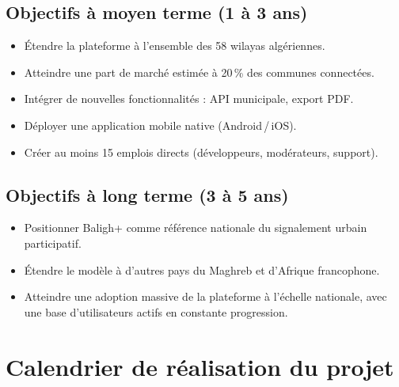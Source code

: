 \documentclass[12pt,a4paper]{report}
\begin{document}
\subsection{Objectifs à moyen terme (1 à 3 ans)}
\begin{itemize}
  \item Étendre la plateforme à l'ensemble des 58 wilayas algériennes.
  \item Atteindre une part de marché estimée à 20\,\% des communes connectées.
  \item Intégrer de nouvelles fonctionnalités : API municipale, export PDF.
  \item Déployer une application mobile native (Android\,/\,iOS).
  \item Créer au moins 15 emplois directs (développeurs, modérateurs, support).
\end{itemize}

\subsection{Objectifs à long terme (3 à 5 ans)}
\begin{itemize}
  \item Positionner Baligh+ comme référence nationale du signalement urbain
        participatif.
  \item Étendre le modèle à d'autres pays du Maghreb et d'Afrique francophone.
  \item Atteindre une adoption massive de la plateforme à l'échelle nationale,
        avec une base d'utilisateurs actifs en constante progression.
\end{itemize}

\section{Calendrier de réalisation du projet}
\end{document}
